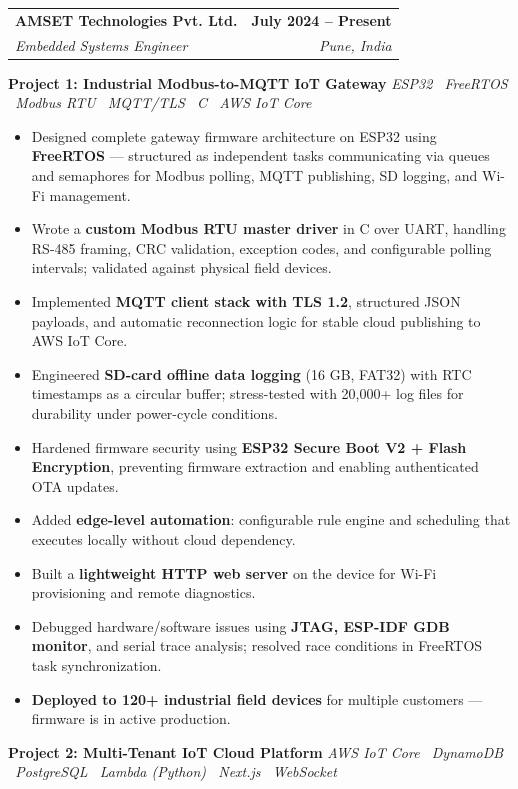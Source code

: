 \documentclass[letterpaper,10.5pt]{article}
\makeatletter
\newcommand{\resumeItem}[1]{%
  \item\small{\color{darkgray}#1\vspace{-1pt}}}
\newcommand{\resumeSubheading}[4]{%
  \vspace{-2pt}\item
  \begin{tabular*}{1.0\textwidth}[t]{l@{\extracolsep{\fill}}r}
    \textbf{\color{navy}#1} & \textbf{\small\color{navy}#2}\\
    \textit{\small\color{medgray}#3} & \textit{\small\color{medgray}#4}\\
  \end{tabular*}\vspace{-6pt}}
\newcommand{\resumeItemListStart}{\begin{itemize}[leftmargin=0.18in,topsep=1pt]}
\newcommand{\resumeItemListEnd}{\end{itemize}\vspace{-3pt}}
\newcommand{\tech}[1]{\textit{\small\color{medgray}#1}}
\makeatother
\begin{document}
  \resumeSubheading
    {AMSET Technologies Pvt. Ltd.}{July 2024 -- Present}
    {Embedded Systems Engineer}{Pune, India}

  \vspace{4pt}
  \textbf{\small\color{navy}Project 1: Industrial Modbus-to-MQTT IoT Gateway}
  \hfill\tech{ESP32 \textbullet\ FreeRTOS \textbullet\ Modbus RTU \textbullet\ MQTT/TLS \textbullet\ C \textbullet\ AWS IoT Core}

  \resumeItemListStart
    \resumeItem{Designed complete gateway firmware architecture on ESP32 using \textbf{FreeRTOS} — structured as independent tasks communicating via queues and semaphores for Modbus polling, MQTT publishing, SD logging, and Wi-Fi management.}
    \resumeItem{Wrote a \textbf{custom Modbus RTU master driver} in C over UART, handling RS-485 framing, CRC validation, exception codes, and configurable polling intervals; validated against physical field devices.}
    \resumeItem{Implemented \textbf{MQTT client stack with TLS 1.2}, structured JSON payloads, and automatic reconnection logic for stable cloud publishing to AWS IoT Core.}
    \resumeItem{Engineered \textbf{SD-card offline data logging} (16 GB, FAT32) with RTC timestamps as a circular buffer; stress-tested with 20,000+ log files for durability under power-cycle conditions.}
    \resumeItem{Hardened firmware security using \textbf{ESP32 Secure Boot V2 + Flash Encryption}, preventing firmware extraction and enabling authenticated OTA updates.}
    \resumeItem{Added \textbf{edge-level automation}: configurable rule engine and scheduling that executes locally without cloud dependency.}
    \resumeItem{Built a \textbf{lightweight HTTP web server} on the device for Wi-Fi provisioning and remote diagnostics.}
    \resumeItem{Debugged hardware/software issues using \textbf{JTAG, ESP-IDF GDB monitor}, and serial trace analysis; resolved race conditions in FreeRTOS task synchronization.}
    \resumeItem{\textbf{Deployed to 120+ industrial field devices} for multiple customers — firmware is in active production.}
  \resumeItemListEnd

  \vspace{4pt}
  \textbf{\small\color{navy}Project 2: Multi-Tenant IoT Cloud Platform}
  \hfill\tech{AWS IoT Core \textbullet\ DynamoDB \textbullet\ PostgreSQL \textbullet\ Lambda (Python) \textbullet\ Next.js \textbullet\ WebSocket}
\end{document}
